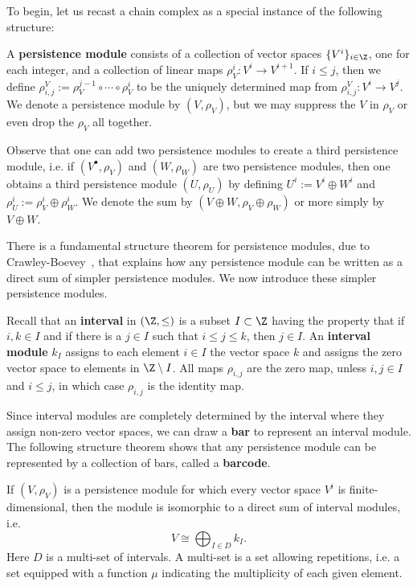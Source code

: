 To begin, let us recast a chain complex as a special instance of the following structure:

\begin{defn}\label{defn:persistence_module}
A \textbf{persistence module} consists of a collection of vector spaces $\{V^i\}_{i\in\Z}$, one for each integer, and a collection of linear maps $\rho^i_V:V^i\to V^{i+1}$. If $i\leq j$, then we define $\rho^V_{i,j}:=\rho^{j-1}_V\circ\cdots\circ \rho^i_V$ to be the uniquely determined map from $\rho^V_{i,j}:V^i\to V^j$. We denote a persistence module by $(V,\rho_V)$, but we may suppress the $V$ in $\rho_V$ or even drop the $\rho_V$ all together.
\end{defn}

Observe that one can add two persistence modules to create a third persistence module, i.e. if $(V^{\bullet},\rho_V)$ and $(W,\rho_W)$ are two persistence modules, then one obtains a third persistence module $(U,\rho_U)$ by defining $U^i:=V^i\oplus W^i$ and $\rho^i_U:=\rho^i_V\oplus \rho^i_W$. We denote the sum by $(V\oplus W,\rho_V\oplus\rho_W)$ or more simply by $V\oplus W$.

There is a fundamental structure theorem for persistence modules, due to Crawley-Boevey~\cite{crawley2012decomposition}, that explains how any persistence module can be written as a direct sum of simpler persistence modules. We now introduce these simpler persistence modules. 
\begin{defn}\label{defn:interval}
Recall that an \textbf{interval} in $(\Z,\leq)$ is a subset $I\subset \Z$ having the property that if $i,k\in I$ and if there is a $j\in I$ such that $i\leq j\leq k$, then $j\in I$. An \textbf{interval module} $k_I$ assigns to each element $i\in I$ the vector space $k$ and assigns the zero vector space to elements in $\Z\setminus I$. All maps $\rho_{i,j}$ are the zero map, unless $i,j\in I$ and $i\leq j$, in which case $\rho_{i,j}$ is the identity map. 
\end{defn}

Since interval modules are completely determined by the interval where they assign non-zero vector spaces, we can draw a \textbf{bar} to represent an interval module. The following structure theorem shows that any persistence module can be represented by a collection of bars, called a \textbf{barcode}.

\begin{thm}\label{thm:crawleyboevey}

If $(V,\rho_V)$ is a persistence module for which every vector space $V^i$ is finite-dimensional, then the module is isomorphic to a direct sum of interval modules, i.e.
\[
V\cong \bigoplus_{I\in D} k_I.
\]
Here $D$ is a multi-set of intervals. A multi-set is a set allowing repetitions, i.e. a set equipped with a function $\mu$ indicating the multiplicity of each given element.

\end{thm}

